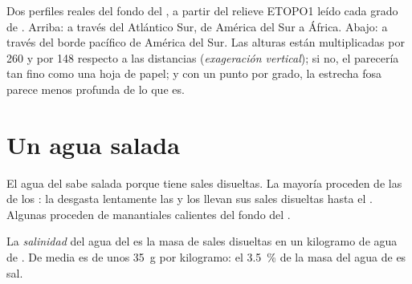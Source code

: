 \begin{omfigure}
{\small Dos perfiles reales del fondo del , a partir del relieve
ETOPO1 leído cada grado de . Arriba: a través del Atlántico Sur, de
América del Sur a África. Abajo: a través del borde pacífico de América del
Sur. Las alturas están multiplicadas por 260 y por 148 respecto a las
distancias (\emph{exageración vertical}); si no, el  parecería tan
fino como una hoja de papel; y con un punto por grado, la estrecha fosa
parece menos profunda de lo que es.}
\label{fig:g8:the-oceans:profiles}
\end{omfigure}


\section{Un agua salada}

El agua del  sabe salada porque tiene sales disueltas. La mayoría
proceden de las  de los : la  desgasta lentamente
las  y los  llevan sus sales disueltas hasta el . Algunas
proceden de manantiales calientes del fondo del .

\begin{definition}[Salinidad]\label{def:g8:the-oceans:salinity}
La \emph{salinidad} del agua del  es la masa de sales
disueltas en un kilogramo de agua de . De media es de unos \qty{35}{g}
por kilogramo: el \qty{3.5}{\%} de la masa del agua de  es sal.
\end{definition}


